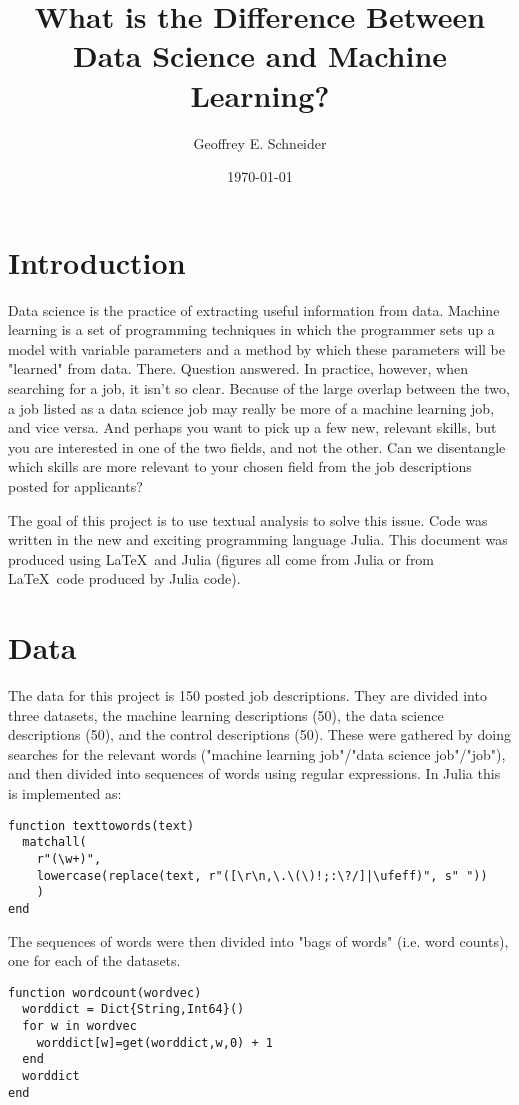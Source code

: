 \documentclass[12pt]{article}
\title{What is the Difference Between Data Science and Machine Learning?}
\date{\today}
\author{Geoffrey E. Schneider}
\begin{document}
\maketitle
\section{Introduction} Data science is the practice of extracting useful information from data. Machine learning is a set of programming techniques in which the programmer sets up a model with variable parameters and a method by which these parameters will be "learned" from data. There. Question answered. In practice, however, when searching for a job, it isn't so clear. Because of the large overlap between the two, a job listed as a data science job may really be more of a machine learning job, and vice versa. And perhaps you want to pick up a few new, relevant skills, but you are interested in one of the two fields, and not the other. Can we disentangle which skills are more relevant to your chosen field from the job descriptions posted for applicants?

The goal of this project is to use textual analysis to solve this issue. Code was written in the new and exciting programming language Julia. This document was produced using \LaTeX\ and Julia (figures all come from Julia\cite{Julia} or from \LaTeX\ code produced by Julia code).

\section{Data} The data for this project is 150 posted job descriptions\cite{LinkedIn}. They are divided into three datasets, the machine learning descriptions (50), the data science descriptions (50), and the control descriptions (50). These were gathered by doing searches for the relevant words ("machine learning job"/"data science job"/"job"), and then divided into sequences of words using regular expressions. In Julia this is implemented as:

\begin{verbatim} 
function texttowords(text)
  matchall(
    r"(\w+)",
    lowercase(replace(text, r"([\r\n,\.\(\)!;:\?/]|\ufeff)", s" "))
    )
end
\end{verbatim}

The sequences of words were then divided into "bags of words" (i.e. word counts), one for each of the datasets.

\begin{verbatim}
function wordcount(wordvec)
  worddict = Dict{String,Int64}()
  for w in wordvec
    worddict[w]=get(worddict,w,0) + 1
  end
  worddict
end
\end{verbatim} 
\end{document}
